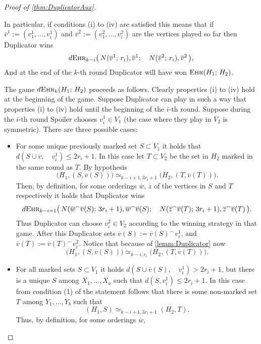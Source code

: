 \documentclass[12pt,notitlepage,a4paper]{article}
\theoremstyle{definition}
\newcommand{\ehr}{\textsc{Ehr}}
\begin{document}
\begin{proof}[Proof of \cref{thm:DuplicatorAux}]
\begin{itemize}
		
	\end{itemize}
	In particular, if conditions (i) to (iv) are satisfied this means
	that if $\overline{v}^1:=(v^1_1,\dots,v^1_i)$ and
	$\overline{v}^2:=(v^2_1,\dots, v^2_i)$ are the vertices played so far
	then Duplicator wins
	\[
	d\ehr_{k-i}\big(\,
	N(\overline{v}^1;\, r_i), \overline{v}^1; \quad
	N(\overline{v}^2;\, r_i),\overline{v}^2 \,
	\big),	
	\]
	And at the end of the $k$-th round Duplicator will have won
	$\ehr(H_1;\, H_2)$. \par
	The game $d\ehr_k(H_1; \, H_2)$ proceeds as follows.
	Clearly properties (i) to (iv) hold at the beginning of 
	the game.  Suppose
	Duplicator can play in such a way that properties (i) to (iv) hold 
	until the beginning of the $i$-th round. Suppose
	during the $i$-th round Spoiler chooses $v^1_i\in V_1$ 
	(the case where they play in $V_2$ is symmetric). There are 
	three possible cases:
	\begin{itemize}[leftmargin=*]
		\item For some unique previously marked set $S\subset V_1$ 
		it holds that $d(S\cup \overline{v},\quad v^1_i)\leq 2r_i +1$. 
		In this case let $T\subset V_2$ be the set in $H_2$ marked in the 
		same round as $T$. By hypothesis 
		\[ \big(H_1,(S,\overline{v}(S))\big)
		\simeq_{k-i+1,3r_i+1}
		\big(H_2,(T,\overline{v}(T))\big). 		
		\]
		Then, by definition,
		for some orderings $\overline{w}$, $\overline{z}$
		of the vertices in $S$ and $T$ respectively it holds that
		Duplicator wins
		\[
		d\ehr_{k-i+1}\big(\,
		N(\overline{w}^\smallfrown \overline{v}(S); \, 3r_i	+ 1)
		, \overline{w}^\smallfrown \overline{v}(S); \quad
		N(\overline{z}^\smallfrown \overline{v}(T); \, 3r_i	+ 1)
		, \overline{z}^\smallfrown \overline{v}(T)\,	
		\big).		
		\]
		Thus Duplicator can choose $v^2_i\in V_2$ according to the 
		winning strategy in that game. After this Duplicator sets 
		$\overline{v}(S):= \overline{v}(S)^\smallfrown v^1_i$, and
		$\overline{v}(T):= \overline{v}(T)^\smallfrown v^2_i$. Notice
		that because of \cref{lemm:Duplicator} now
		\[
		\big(H_1, (S,\overline{v}(S))\big)\simeq_{k-i,r_i}
		\big(H_2, (T,\overline{v}(T))\big).
		\]
		\item For all marked sets $S\subset V_1$ it holds
		$d(S\cup \overline{v}(S), \quad v^1_i)>2r_i +1$, but there is
		a unique $S$ among $X_1,\dots, X_a$ such that
		$d(S,v^1_i)\leq 2r_i+1$. In this case from condition (1)
		of the statement follows that there is some non-marked
		set $T$ among $Y_1,\dots, Y_b$ such that
		\[
		(H_1,S)\simeq_{k-i+1,3r_i+1} (H_2,T).\] 
		Thus, by definition, for some orderings $\overline{w}$, 

\end{itemize}
\end{proof}
\end{document}
